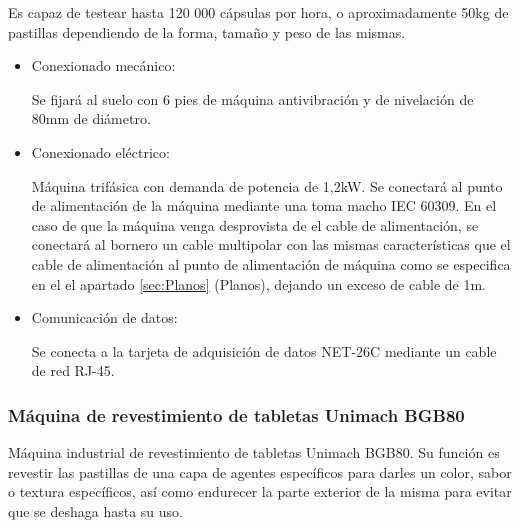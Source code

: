 	Es capaz de testear hasta 120 000 cápsulas por hora, o aproximadamente 50kg de pastillas dependiendo de la forma, tamaño y peso de las mismas.\\



		\begin{itemize}
				\item{Conexionado mecánico:}
				
				Se fijará al suelo con 6 pies de máquina antivibración y de nivelación de 80mm de diámetro.

				\item{Conexionado eléctrico:}

				Máquina trifásica con demanda de potencia de 1,2kW. Se conectará al punto de alimentación de la máquina mediante una  toma macho IEC 60309. En el caso de que la máquina venga desprovista de el cable de alimentación, se conectará al bornero un cable multipolar con las mismas características que el cable de alimentación al punto de alimentación de máquina como se especifica en el el apartado \ref{sec:Planos} (Planos), dejando un exceso de cable de 1m. \
				
				\item{Comunicación de datos:}

				Se conecta a la tarjeta de adquisición de datos NET-26C mediante un cable de red RJ-45.
		\end{itemize}

	\newpage


	\subsubsection{Máquina de revestimiento de tabletas Unimach BGB80}
		
	
	
	Máquina industrial de revestimiento de tabletas Unimach BGB80. Su función es revestir las pastillas de una capa de agentes específicos para darles un color, sabor o textura específicos, así como endurecer la parte exterior de la misma para evitar que se deshaga hasta su uso.\\

